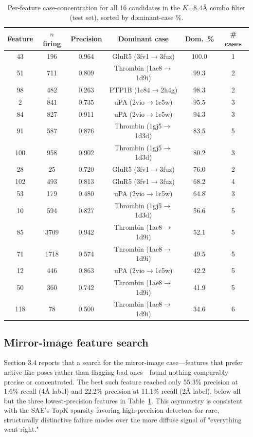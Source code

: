 \documentclass{article}
\begin{document}
\begin{table}[!ht]
\caption{\small Per-feature case-concentration for all 16 candidates in the $K$=8 4Å combo filter (test set), sorted by dominant-case \%.}
\label{tab:case_full}
\centering
\begin{small}
\begin{tabular}{cccccc}
\toprule
Feature & $n$ firing & Precision & Dominant case & Dom.\ \% & \# cases \\
\midrule
43  & 196  & 0.964 & GluR5 (3fv1$\to$3fuz)    & 100.0 & 1 \\
51  & 711  & 0.809 & Thrombin (1ae8$\to$1d9i) & 99.3  & 2 \\
98  & 482  & 0.263 & PTP1B (1c84$\to$2h4g)    & 98.3  & 2 \\
2   & 841  & 0.735 & uPA (2vio$\to$1c5w)      & 95.5  & 3 \\
84  & 827  & 0.911 & uPA (2vio$\to$1c5w)      & 94.3  & 3 \\
91  & 587  & 0.876 & Thrombin (1gj5$\to$1d3d) & 83.5  & 5 \\
100 & 958  & 0.902 & Thrombin (1gj5$\to$1d3d) & 80.2  & 3 \\
28  & 25   & 0.720 & GluR5 (3fv1$\to$3fuz)    & 76.0  & 2 \\
102 & 493  & 0.813 & GluR5 (3fv1$\to$3fuz)    & 68.2  & 4 \\
53  & 179  & 0.480 & uPA (2vio$\to$1c5w)      & 64.8  & 3 \\
10  & 594  & 0.827 & Thrombin (1gj5$\to$1d3d) & 56.6  & 5 \\
85  & 3709 & 0.942 & Thrombin (1ae8$\to$1d9i) & 52.1  & 5 \\
71  & 1718 & 0.574 & Thrombin (1ae8$\to$1d9i) & 49.5  & 5 \\
12  & 446  & 0.863 & uPA (2vio$\to$1c5w)      & 42.2  & 5 \\
50  & 360  & 0.742 & Thrombin (1ae8$\to$1d9i) & 41.9  & 5 \\
118 & 78   & 0.500 & Thrombin (1ae8$\to$1d9i) & 34.6  & 6 \\
\bottomrule
\end{tabular}
\end{small}
\end{table}

\subsection{Mirror-image feature search}
\label{app:mirror}

Section 3.4 reports that a search for the mirror-image case---features that prefer native-like poses rather than flagging bad ones---found nothing comparably precise or concentrated. The best such feature reached only 55.3\% precision at 1.6\% recall (4Å label) and 22.2\% precision at 11.1\% recall (2Å label), below all but the three lowest-precision features in Table~\ref{tab:case_full}. This asymmetry is consistent with the SAE's TopK sparsity favoring high-precision detectors for rare, structurally distinctive failure modes over the more diffuse signal of "everything went right."
\end{document}
